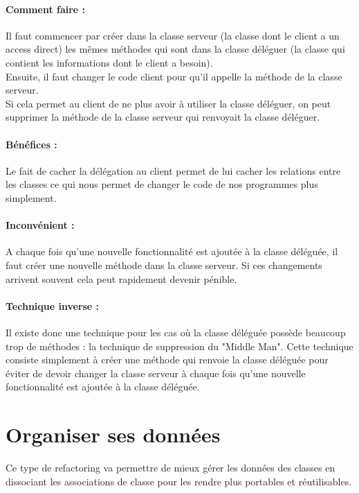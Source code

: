 \documentclass[a4paper,twoside,12pt,openright]{report}
\begin{document}
\paragraph{Comment faire :}
Il faut commencer par créer dans la classe serveur (la classe dont le client a un access direct) les mêmes méthodes qui sont dans la classe déléguer (la classe qui contient les informations dont le client a besoin).\\
Ensuite, il faut changer le code client pour qu'il appelle la méthode de la classe serveur.\\
Si cela permet au client de ne plus avoir à utiliser la classe déléguer, on peut supprimer la méthode de la classe serveur qui renvoyait la classe déléguer.

\paragraph{Bénéfices :}
Le fait de cacher la délégation au client permet de lui cacher les relations entre les classes ce qui nous permet de changer le code de nos programmes plus simplement.

\paragraph{Inconvénient :}
A chaque fois qu'une nouvelle fonctionnalité est ajoutée à la classe déléguée, il faut créer une nouvelle méthode dans la classe serveur. Si ces changements arrivent souvent cela peut rapidement devenir pénible.

\paragraph{Technique inverse :}
Il existe donc une technique pour les cas où la classe déléguée possède beaucoup trop de méthodes : la technique de suppression du "Middle Man".
Cette technique consiste simplement à créer une méthode qui renvoie la classe déléguée pour éviter de devoir changer la classe serveur à chaque fois qu'une nouvelle fonctionnalité est ajoutée à la classe déléguée.\\


\newpage
\section{Organiser ses données}
Ce type de refactoring va permettre de mieux gérer les données des classes en dissociant les associations de classe pour les rendre plus portables et réutilisables.\\
\end{document}
